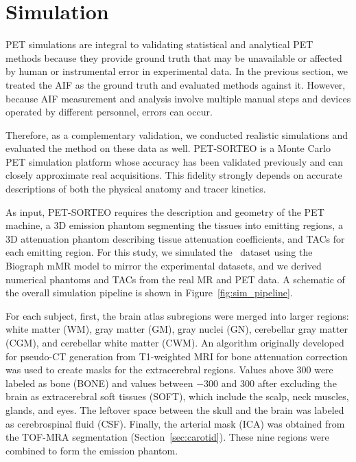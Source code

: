 \section{Simulation}\label{sec:methods_simulation} %
PET simulations are integral to validating statistical and analytical PET methods because they provide ground truth that may be unavailable or affected by human or instrumental error in experimental data.
In the previous section, we treated the AIF as the ground truth and evaluated methods against it.
However, because AIF measurement and analysis involve multiple manual steps and devices operated by different personnel, errors can occur.

Therefore, as a complementary validation, we conducted realistic simulations and evaluated the method on these data as well.
PET-SORTEO is a Monte Carlo PET simulation platform \cite{reilhac2004pet,reilhac2016validation} whose accuracy has been validated previously \cite{reilhac2005pet} and can closely approximate real acquisitions.
This fidelity strongly depends on accurate descriptions of both the physical anatomy and tracer kinetics.

As input, PET-SORTEO requires the description and geometry of the PET machine, a 3D emission phantom segmenting the tissues into emitting regions, a 3D attenuation phantom describing tissue attenuation coefficients, and TACs for each emitting region.
For this study, we simulated the \fdg\ dataset using the Biograph mMR model to mirror the experimental datasets, and we derived numerical phantoms and TACs from the real MR and PET data.
A schematic of the overall simulation pipeline is shown in Figure~\ref{fig:sim_pipeline}. %

For each subject, first, the brain atlas subregions were merged into larger regions: white matter (WM), gray matter (GM), gray nuclei (GN), cerebellar gray matter (CGM), and cerebellar white matter (CWM).
An algorithm originally developed for pseudo-CT generation from T1-weighted MRI for bone attenuation correction was used to create masks for the extracerebral regions\cite{mérid2017}.
Values above 300 were labeled as bone (BONE) and values between \(-300\) and \(300\) after excluding the brain as extracerebral soft tissues (SOFT), which include the scalp, neck muscles, glands, and eyes. %
The leftover space between the skull and the brain was labeled as cerebrospinal fluid (CSF).
Finally, the arterial mask (ICA) was obtained from the TOF-MRA segmentation (Section~\ref{sec:carotid}).
These nine regions were combined to form the emission phantom.

